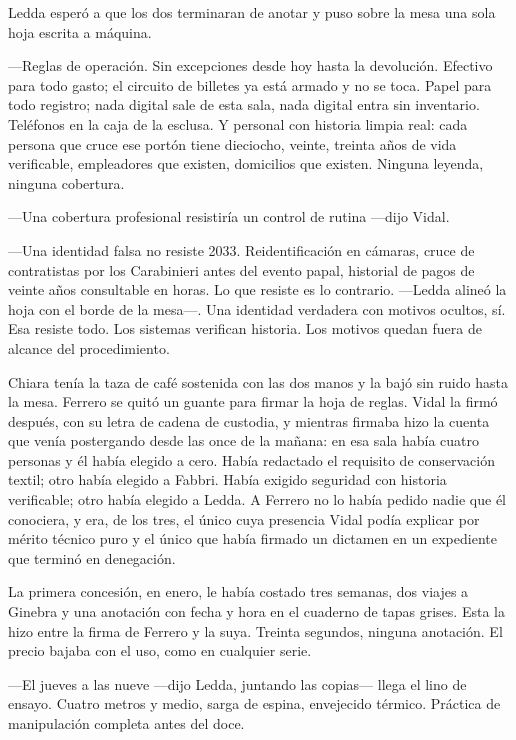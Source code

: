 Ledda esperó a que los dos terminaran de anotar y puso sobre la mesa una sola hoja escrita a máquina.

---Reglas de operación. Sin excepciones desde hoy hasta la devolución. Efectivo para todo gasto; el circuito de billetes ya está armado y no se toca. Papel para todo registro; nada digital sale de esta sala, nada digital entra sin inventario. Teléfonos en la caja de la esclusa. Y personal con historia limpia real: cada persona que cruce ese portón tiene dieciocho, veinte, treinta años de vida verificable, empleadores que existen, domicilios que existen. Ninguna leyenda, ninguna cobertura.

---Una cobertura profesional resistiría un control de rutina ---dijo Vidal.

---Una identidad falsa no resiste 2033. Reidentificación en cámaras, cruce de contratistas por los Carabinieri antes del evento papal, historial de pagos de veinte años consultable en horas. Lo que resiste es lo contrario. ---Ledda alineó la hoja con el borde de la mesa---. Una identidad verdadera con motivos ocultos, sí. Esa resiste todo. Los sistemas verifican historia. Los motivos quedan fuera de alcance del procedimiento.

Chiara tenía la taza de café sostenida con las dos manos y la bajó sin ruido hasta la mesa. Ferrero se quitó un guante para firmar la hoja de reglas. Vidal la firmó después, con su letra de cadena de custodia, y mientras firmaba hizo la cuenta que venía postergando desde las once de la mañana: en esa sala había cuatro personas y él había elegido a cero. Había redactado el requisito de conservación textil; otro había elegido a Fabbri. Había exigido seguridad con historia verificable; otro había elegido a Ledda. A Ferrero no lo había pedido nadie que él conociera, y era, de los tres, el único cuya presencia Vidal podía explicar por mérito técnico puro y el único que había firmado un dictamen en un expediente que terminó en denegación.

La primera concesión, en enero, le había costado tres semanas, dos viajes a Ginebra y una anotación con fecha y hora en el cuaderno de tapas grises. Esta la hizo entre la firma de Ferrero y la suya. Treinta segundos, ninguna anotación. El precio bajaba con el uso, como en cualquier serie.

---El jueves a las nueve ---dijo Ledda, juntando las copias--- llega el lino de ensayo. Cuatro metros y medio, sarga de espina, envejecido térmico. Práctica de manipulación completa antes del doce.


